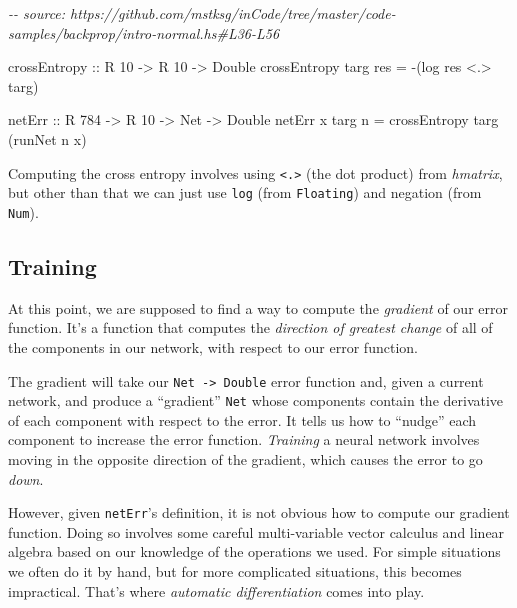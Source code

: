 \documentclass[]{article}
\newenvironment{Shaded}{}{}
\newcommand{\CommentTok}[1]{\textcolor[rgb]{0.38,0.63,0.69}{\textit{#1}}}
\newcommand{\DataTypeTok}[1]{\textcolor[rgb]{0.56,0.13,0.00}{#1}}
\newcommand{\DecValTok}[1]{\textcolor[rgb]{0.25,0.63,0.44}{#1}}
\newcommand{\FunctionTok}[1]{\textcolor[rgb]{0.02,0.16,0.49}{#1}}
\newcommand{\NormalTok}[1]{#1}
\newcommand{\OperatorTok}[1]{\textcolor[rgb]{0.40,0.40,0.40}{#1}}
\newcommand{\OtherTok}[1]{\textcolor[rgb]{0.00,0.44,0.13}{#1}}
\begin{document}
\begin{Shaded}
\begin{Highlighting}[]
\CommentTok{{-}{-} source: https://github.com/mstksg/inCode/tree/master/code{-}samples/backprop/intro{-}normal.hs\#L36{-}L56}

\NormalTok{crossEntropy}
\OtherTok{    ::} \DataTypeTok{R} \DecValTok{10}
    \OtherTok{{-}\textgreater{}} \DataTypeTok{R} \DecValTok{10}
    \OtherTok{{-}\textgreater{}} \DataTypeTok{Double}
\NormalTok{crossEntropy targ res }\OtherTok{=} \OperatorTok{{-}}\NormalTok{(}\FunctionTok{log}\NormalTok{ res }\OperatorTok{\textless{}.\textgreater{}}\NormalTok{ targ)}

\NormalTok{netErr}
\OtherTok{    ::} \DataTypeTok{R} \DecValTok{784}
    \OtherTok{{-}\textgreater{}} \DataTypeTok{R} \DecValTok{10}
    \OtherTok{{-}\textgreater{}} \DataTypeTok{Net}
    \OtherTok{{-}\textgreater{}} \DataTypeTok{Double}
\NormalTok{netErr x targ n }\OtherTok{=}\NormalTok{ crossEntropy targ (runNet n x)}
\end{Highlighting}
\end{Shaded}

Computing the cross entropy involves using \texttt{\textless{}.\textgreater{}}
(the dot product) from \emph{hmatrix}, but other than that we can just use
\texttt{log} (from \texttt{Floating}) and negation (from \texttt{Num}).

\subsection{Training}\label{training}

At this point, we are supposed to find a way to compute the \emph{gradient} of
our error function. It's a function that computes the \emph{direction of
greatest change} of all of the components in our network, with respect to our
error function.

The gradient will take our \texttt{Net\ -\textgreater{}\ Double} error function
and, given a current network, and produce a ``gradient'' \texttt{Net} whose
components contain the derivative of each component with respect to the error.
It tells us how to ``nudge'' each component to increase the error function.
\emph{Training} a neural network involves moving in the opposite direction of
the gradient, which causes the error to go \emph{down}.

However, given \texttt{netErr}'s definition, it is not obvious how to compute
our gradient function. Doing so involves some careful multi-variable vector
calculus and linear algebra based on our knowledge of the operations we used.
For simple situations we often do it by hand, but for more complicated
situations, this becomes impractical. That's where \emph{automatic
differentiation} comes into play.
\end{document}

